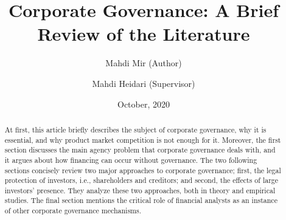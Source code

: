 \documentclass[final,1p,authoryear]{elsarticle}
\date{October, 2020}
\begin{document}
\begin{frontmatter}


\title{Corporate Governance: A Brief Review of the Literature}

	
	

\author[1]{Mahdi Mir (Author)}

\author[1]{Mahdi Heidari (Supervisor)}

\address[1]{Tehran Institute for Advanced Studies (TeIAS), 17 East Daneshvar St.,
North Shirazi St., Mollasadra Blvd., Tehran, Iran.}




\begin{abstract}

	At first, this article briefly describes the subject of corporate governance, why it is essential, and why product market competition is not enough for it. Moreover, the first section discusses the main agency problem that corporate governance deals with, and it argues about how financing can occur without governance. The two following sections concisely review two major approaches to corporate governance; first, the legal protection of investors, i.e., shareholders and creditors; and second, the effects of large investors' presence. They analyze these two approaches, both in theory and empirical studies. The final section mentions the critical role of financial analysts as an instance of other corporate governance mechanisms.
	

\end{abstract}
\end{frontmatter}
\end{document}
